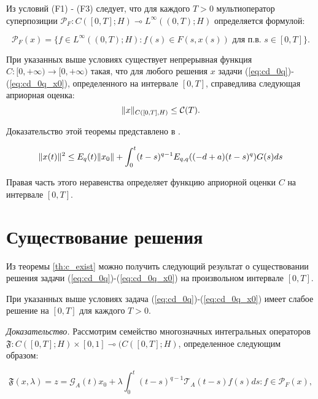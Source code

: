 Из условий (F1) - (F3) следует, что для каждого $T > 0$ мультиоператор суперпозиции
$\mathcal{P}_F: C([0, T]; H) \multimap L^\infty ((0, T); H)$ определяется формулой:

\begin{equation}
    \mathcal{P}_F(x) = \{ f \in L^\infty ((0, T); H): f(s) \in F(s, x(s)) \text{ для п.в. } s \in [0, T] \}.
\end{equation}

\begin{theorem}
    \label{th:c_exist}
    При указанных выше условиях существует непрерывная функция $C: [0, +\infty) \rightarrow [0, +\infty)$ такая,
    что для любого решения $x$ задачи (\ref{eq:cd_0q})-(\ref{eq:cd_0q_x0}), определенного на интервале $[0, T]$,
    справедлива следующая априорная оценка:
    $$\lVert x\rVert_{C([0, T], H)} \leq \mathcal{C}(T).$$
\end{theorem}

\noindent Доказательство этой теоремы представлено в \cite{kamenskii_main}.

\begin{equation}
    \label{eq:C}
    \lVert x(t)\rVert^2 \leq E_q(t)\lVert x_0\rVert + \int_0^t (t-s)^{q-1} E_{q,q}((-d+a)(t-s)^q)G(s)ds
\end{equation}

Правая часть этого неравенства определяет функцию априорной оценки $C$ на интервале $[0, T]$.

\section{Существование решения}

Из теоремы \ref{th:c_exist} можно получить следующий результат о существовании решения задачи (\ref{eq:cd_0q})-(\ref{eq:cd_0q_x0}) на произвольном
интервале $[0, T]$.

\begin{theorem}
    При указанных выше условиях задача (\ref{eq:cd_0q})-(\ref{eq:cd_0q_x0}) имеет слабое решение на $[0, T]$ для каждого $T > 0$.
\end{theorem}

\noindent \textit{Доказательство.} Рассмотрим семейство многозначных интегральных операторов
$\mathfrak{F}: C([0, T]; H) \times [0, 1] \multimap (C([0, T]; H)$, определенное следующим образом:

\begin{equation}
    \label{eq:F_xlambda}
    \mathfrak{F}(x, \lambda) = {z = \mathcal{G}_A (t) x_0 + \lambda \int_0^t (t-s)^{q-1} \mathcal{T}_A (t-s) f(s) ds:
    f \in \mathcal{P}_F (x)},
\end{equation}


